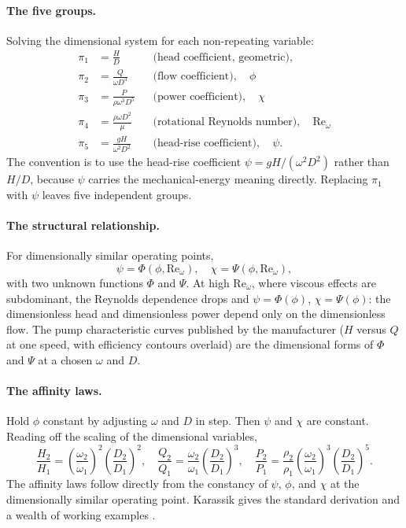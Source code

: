 \paragraph{The five groups.} Solving the dimensional system for each
non-repeating variable:
\begin{align*}
\pi_{1} &= \frac{H}{D} && \text{(head coefficient, geometric)}, \\
\pi_{2} &= \frac{Q}{\omega D^{3}} && \text{(flow coefficient)},
  \quad \phi \\
\pi_{3} &= \frac{P}{\rho \omega^{3} D^{5}}
  && \text{(power coefficient)}, \quad \chi \\
\pi_{4} &= \frac{\rho \omega D^{2}}{\mu}
  && \text{(rotational Reynolds number)}, \quad \mathrm{Re}_{\omega} \\
\pi_{5} &= \frac{g H}{\omega^{2} D^{2}}
  && \text{(head-rise coefficient)}, \quad \psi.
\end{align*}
The convention is to use the head-rise coefficient $\psi = gH/
(\omega^{2} D^{2})$ rather than $H/D$, because $\psi$ carries the
mechanical-energy meaning directly. Replacing $\pi_{1}$ with
$\psi$ leaves five independent groups.

\paragraph{The structural relationship.} For dimensionally similar
operating points,
\[
\psi = \Phi(\phi, \mathrm{Re}_{\omega}), \quad
\chi = \Psi(\phi, \mathrm{Re}_{\omega}),
\]
with two unknown functions $\Phi$ and $\Psi$. At high
$\mathrm{Re}_{\omega}$, where viscous effects are subdominant,
the Reynolds dependence drops and
$\psi = \Phi(\phi)$, $\chi = \Psi(\phi)$: the dimensionless head
and dimensionless power depend only on the dimensionless flow. The
pump characteristic curves published by the manufacturer
($H$ versus $Q$ at one speed, with efficiency contours overlaid)
are the dimensional forms of $\Phi$ and $\Psi$ at a chosen
$\omega$ and $D$.

\paragraph{The affinity laws.} Hold $\phi$ constant by adjusting
$\omega$ and $D$ in step. Then $\psi$ and $\chi$ are constant.
Reading off the scaling of the dimensional variables,
\[
\boxed{\frac{H_{2}}{H_{1}} = \left(\frac{\omega_{2}}{\omega_{1}}\right)^{2}
  \left(\frac{D_{2}}{D_{1}}\right)^{2}, \quad
\frac{Q_{2}}{Q_{1}} = \frac{\omega_{2}}{\omega_{1}}
  \left(\frac{D_{2}}{D_{1}}\right)^{3}, \quad
\frac{P_{2}}{P_{1}} = \frac{\rho_{2}}{\rho_{1}}
  \left(\frac{\omega_{2}}{\omega_{1}}\right)^{3}
  \left(\frac{D_{2}}{D_{1}}\right)^{5}.}
\]
The affinity laws follow directly from the constancy of $\psi$,
$\phi$, and $\chi$ at the dimensionally similar operating point.
Karassik gives the standard derivation and a wealth of working
examples \cite{text:ch02t3-karassik-pumps}.

